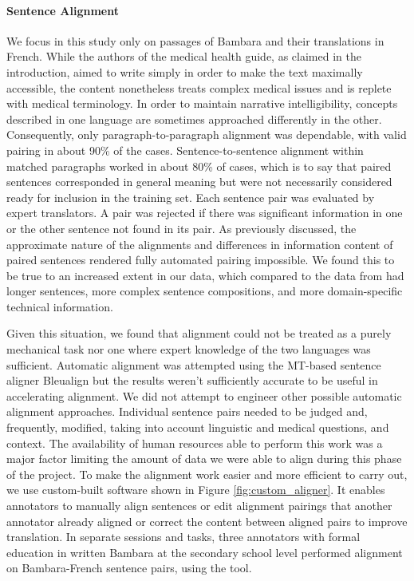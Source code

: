 \documentclass[11pt,a4paper]{article}
\begin{document}

\paragraph{Sentence Alignment} We focus in this study only on passages of Bambara and their translations in French. While the authors of the medical health guide, as claimed in the introduction, aimed to write simply in order to make the text maximally accessible, the content nonetheless treats complex medical issues and is replete with medical terminology. In order to maintain narrative intelligibility, concepts described in one language are sometimes approached differently in the other. Consequently, only paragraph-to-paragraph alignment was dependable, with valid pairing in about 90\% of the cases. Sentence-to-sentence alignment within matched paragraphs worked in about 80\% of cases, which is to say that paired sentences corresponded in general meaning but were not necessarily considered ready for inclusion in the training set. Each sentence pair was evaluated by expert translators. A pair was rejected if there was significant information in one or the other sentence not found in its pair. As \citet{tapo-etal-2020-neural} previously discussed, the approximate nature of the alignments and differences in information content of paired sentences rendered fully automated pairing impossible. We found this to be true to an increased extent in our data, which compared to the data from \citet{tapo-etal-2020-neural} had longer sentences, more complex sentence compositions, and more domain-specific technical information.

Given this situation, we found that alignment could not be treated as a purely mechanical task nor one where expert knowledge of the two languages was sufficient. Automatic alignment was attempted using the MT-based sentence aligner Bleualign \citet{sennrich2010mt} but the results weren't sufficiently accurate to be useful in accelerating alignment. We did not attempt to engineer other possible automatic alignment approaches. Individual sentence pairs needed to be judged and, frequently, modified, taking into account linguistic and medical questions, and context. The availability of human resources able to perform this work was a major factor limiting the amount of data we were able to align during this phase of the project. To make the alignment work easier and more efficient to carry out, we use custom-built software shown in Figure \ref{fig:custom_aligner}. It enables annotators to manually align sentences or edit alignment pairings that another annotator already aligned or correct the content between aligned pairs to improve translation. In separate sessions and tasks, three annotators with formal education in written Bambara at the secondary school level performed alignment on Bambara-French sentence pairs, using the tool.
\end{document}
